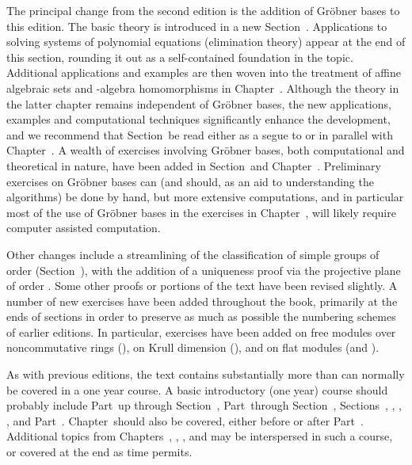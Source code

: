 
\startchapter
  [
    title=Preface to the Third Edition,
    list=Preface,
    bookmark=Preface,
    marking=Preface,
  ]

  The principal change from the second edition is the addition of Gröbner bases to this edition. The basic theory is introduced in a new Section~\in[sect:09.06]. Applications to solving systems of polynomial equations (elimination theory) appear at the end of this section, rounding it out as a self-contained foundation in the topic. Additional applications and examples are then woven into the treatment of affine algebraic sets and -algebra homomorphisms in Chapter~\in[chap:15]. Although the theory in the latter chapter remains independent of Gröbner bases, the new applications, examples and computational techniques significantly enhance the development, and we recommend that Section~\in[sect:09.06] be read either as a segue to or in parallel with Chapter~\in[chap:15]. A wealth of exercises involving Gröbner bases, both computational and theoretical in nature, have been added in Section~\in[sect:09.06] and Chapter~\in[chap:15]. Preliminary exercises on Gröbner bases can (and should, as an aid to understanding the algorithms) be done by hand, but more extensive computations, and in particular most of the use of Gröbner bases in the exercises in Chapter~\in[chap:15], will likely require computer assisted computation.

  Other changes include a streamlining of the classification of simple groups of order  (Section~\in[sect:06.02]), with the addition of a uniqueness proof via the projective plane of order . Some other proofs or portions of the text have been revised slightly. A number of new exercises have been added throughout the book, primarily at the ends of sections in order to preserve as much as possible the numbering schemes of earlier editions. In particular, exercises have been added on free modules over noncommutative rings (\in[sect:10.03]), on Krull dimension (\in[sect:15.03]), and on flat modules (\in[sect:10.05] and \in[sect:17.01]).

  As with previous editions, the text contains substantially more than can normally be covered in a one year course. A basic introductory (one year) course should probably include Part~\in[part:01] up through Section~\in[sect:05.03], Part~\in[part:02] through Section~\in[sect:09.05], Sections~\in[sect:10.01], \in[sect:10.02], \in[sect:10.03], \in[sect:11.01], \in[sect:11.02] and Part~\in[part:04]. Chapter~\in[chap:12] should also be covered, either before or after Part~\in[part:04]. Additional topics from Chapters~\in[chap:05], \in[chap:06], \in[chap:09], \in[chap:10] and \in[chap:11] may be interspersed in such a course, or covered at the end as time permits.

